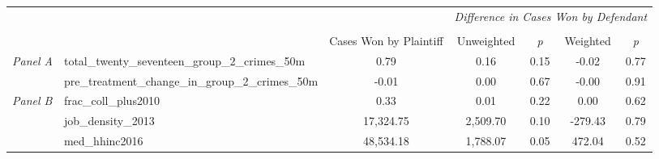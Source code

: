 \begin{tabular}{llccccc}
\toprule
 &  & \textit{} & \multicolumn{4}{c}{\textit{Difference in Cases Won by Defendant}} \\
\cline{4-7}
\\
 &  & Cases Won by Plaintiff & Unweighted & \emph{p} & Weighted & \emph{p} \\
\midrule
\multirow[c]{2}{3cm}{\textit{Panel A}} & total_twenty_seventeen_group_2_crimes_50m & 0.79 & 0.16 & 0.15 & -0.02 & 0.77 \\
 & pre_treatment_change_in_group_2_crimes_50m & -0.01 & 0.00 & 0.67 & -0.00 & 0.91 \\
\cline{1-7}
\multirow[c]{3}{3cm}{\textit{Panel B}} & frac_coll_plus2010 & 0.33 & 0.01 & 0.22 & 0.00 & 0.62 \\
 & job_density_2013 & 17,324.75 & 2,509.70 & 0.10 & -279.43 & 0.79 \\
 & med_hhinc2016 & 48,534.18 & 1,788.07 & 0.05 & 472.04 & 0.52 \\
\cline{1-7}
\bottomrule
\end{tabular}
